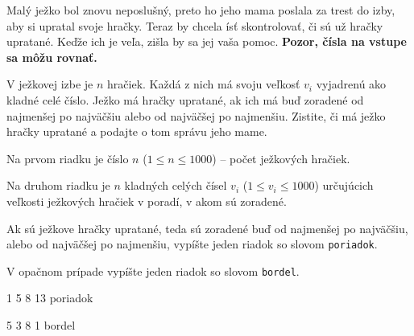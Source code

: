 




Malý ježko bol znovu neposlušný, preto ho jeho mama poslala za trest do izby, aby si upratal svoje
hračky. Teraz by chcela ísť skontrolovať, či sú už hračky upratané. Keďže ich je veľa, zišla by
sa jej vaša pomoc. \textbf{Pozor, čísla na vstupe sa môžu rovnať.}


V ježkovej izbe je $n$ hračiek. Každá z nich má svoju veľkosť $v_i$ vyjadrenú ako kladné celé číslo.
Ježko má hračky upratané, ak ich má buď zoradené od najmenšej po najväčšiu alebo od najväčšej po
najmenšiu. Zistite, či má ježko hračky upratané a podajte o tom správu jeho mame.


Na prvom riadku je číslo $n$ ($1 \leq n \leq 1000$) -- počet ježkových hračiek.

Na druhom riadku je $n$ kladných celých čísel $v_i$ ($1 \leq v_i \leq 1000$) určujúcich veľkosti
ježkových hračiek v poradí, v akom sú zoradené.


Ak sú ježkove hračky upratané, teda sú zoradené buď od najmenšej po najväčšiu, alebo od najväčšej po
najmenšiu, vypíšte jeden riadok so slovom \texttt{poriadok}.

V opačnom prípade vypíšte jeden riadok so slovom \texttt{bordel}.


1 5 8 13
\vystup
poriadok
\koniec

5 3 8 1
\vystup
bordel
\koniec


